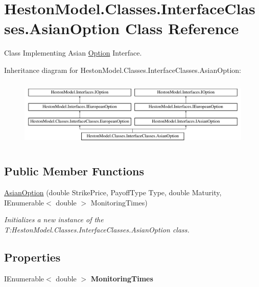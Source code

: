 \hypertarget{class_heston_model_1_1_classes_1_1_interface_classes_1_1_asian_option}{}\section{Heston\+Model.\+Classes.\+Interface\+Classes.\+Asian\+Option Class Reference}
\label{class_heston_model_1_1_classes_1_1_interface_classes_1_1_asian_option}


Class Implementing Asian \mbox{\hyperlink{class_heston_model_1_1_classes_1_1_interface_classes_1_1_option}{Option}} Interface.  


Inheritance diagram for Heston\+Model.\+Classes.\+Interface\+Classes.\+Asian\+Option\+:\begin{figure}[H]
\begin{center}
\leavevmode
\includegraphics[height=3.333333cm]{class_heston_model_1_1_classes_1_1_interface_classes_1_1_asian_option}
\end{center}
\end{figure}
\subsection*{Public Member Functions}
\begin{DoxyCompactItemize}
\item 
\mbox{\hyperlink{class_heston_model_1_1_classes_1_1_interface_classes_1_1_asian_option_a8872872e8e5bc90c1f24af71b778b9b0}{Asian\+Option}} (double Strike\+Price, Payoff\+Type Type, double Maturity, I\+Enumerable$<$ double $>$ Monitoring\+Times)
\begin{DoxyCompactList}\small\item\em Initializes a new instance of the T\+:\+Heston\+Model.\+Classes.\+Interface\+Classes.\+Asian\+Option class. \end{DoxyCompactList}\end{DoxyCompactItemize}
\subsection*{Properties}
\begin{DoxyCompactItemize}
\item 
\mbox{\label{class_heston_model_1_1_classes_1_1_interface_classes_1_1_asian_option_a275f6d3fb7941a068e079dc3a5a5b5b9}} 
I\+Enumerable$<$ double $>$ {\bfseries Monitoring\+Times}
\end{DoxyCompactItemize}


